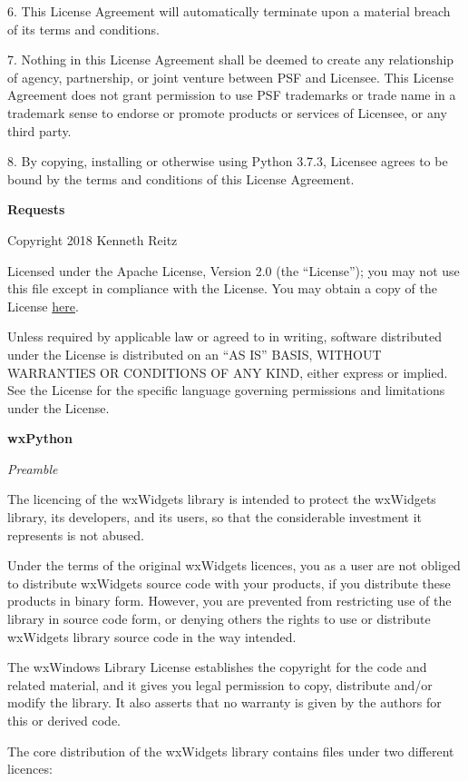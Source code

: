 6. This License Agreement will automatically terminate upon a material breach of
its terms and conditions.

7. Nothing in this License Agreement shall be deemed to create any relationship
of agency, partnership, or joint venture between PSF and Licensee.  This License
Agreement does not grant permission to use PSF trademarks or trade name in a
trademark sense to endorse or promote products or services of Licensee, or any
third party.

8. By copying, installing or otherwise using Python 3.7.3, Licensee agrees
to be bound by the terms and conditions of this License Agreement.

\textbf{Requests}

Copyright 2018 Kenneth Reitz

Licensed under the Apache License, Version 2.0 (the “License”); you may not use this file except in compliance with the License. You may obtain a copy of the License \href{https://www.apache.org/licenses/LICENSE-2.0}{here}.

Unless required by applicable law or agreed to in writing, software distributed under the License is distributed on an “AS IS” BASIS, WITHOUT WARRANTIES OR CONDITIONS OF ANY KIND, either express or implied. See the License for the specific language governing permissions and limitations under the License.

\textbf{wxPython}

\textit{Preamble}

The licencing of the wxWidgets library is intended to protect the wxWidgets
library, its developers, and its users, so that the considerable investment it
represents is not abused.

Under the terms of the original wxWidgets licences, you as a user are not
obliged to distribute wxWidgets source code with your products, if you
distribute these products in binary form. However, you are prevented from
restricting use of the library in source code form, or denying others the
rights to use or distribute wxWidgets library source code in the way intended.

The wxWindows Library License establishes the copyright for the code and
related material, and it gives you legal permission to copy, distribute and/or
modify the library. It also asserts that no warranty is given by the authors
for this or derived code.

The core distribution of the wxWidgets library contains files under two
different licences:

